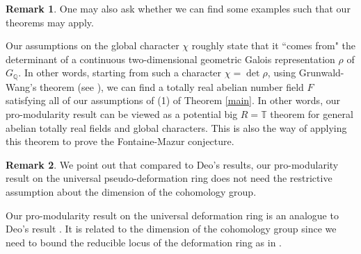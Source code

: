 \documentclass[12pt]{amsart}
\theoremstyle{plain}
\newtheorem{thm}{Theorem}[subsection]
\theoremstyle{definition}
\newtheorem{rem}[thm]{Remark}
\theoremstyle{remark}
\begin{document}
\begin{rem}
	One may also ask whether we can find some examples such that our theorems may apply.
	
	Our assumptions on the global  character $\chi$ roughly state that it ``comes from" the determinant of a continuous two-dimensional geometric Galois representation $\rho$ of $G_{\mathbb{Q}}$. In other words, starting from such a character $\chi=\operatorname{det} \rho$, using Grunwald-Wang's theorem (see \cite[Theorem 5, page 80]{artin}), we can find a totally real abelian number field $F$ satisfying all of our assumptions of (1) of Theorem \ref{main}. In other words, our pro-modularity result can be viewed as a potential big $R=\mathbb{T}$ theorem for general abelian totally real fields and global characters. This is also the way of applying this theorem to prove the Fontaine-Mazur conjecture.
\end{rem}

	\begin{rem}
		We point out that compared to Deo's results, our pro-modularity result on the universal pseudo-deformation ring does not need the restrictive assumption about the dimension of the cohomology group.
		
		Our pro-modularity result on the universal deformation ring is an analogue to Deo's result \cite[Theorem 4.5]{deo2023density}. It is related to the dimension of the cohomology group since we need to bound the reducible locus of the deformation ring as in \cite{skinner1999residually}.
	\end{rem}
	



	
	
	
	
\end{document}
